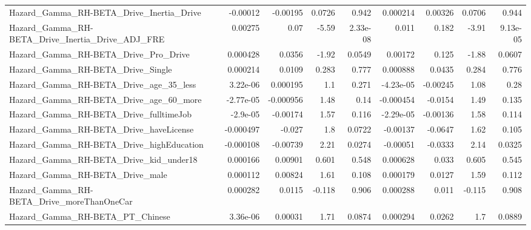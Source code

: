 \begin{tabular}{lrrrrrrrr}
Hazard\_Gamma\_RH-BETA\_Drive\_Inertia\_Drive           &    -0.00012 &     -0.00195 &   0.0726 &    0.942 &   0.000214 &     0.00326 &       0.0706 &         0.944 \\
Hazard\_Gamma\_RH-BETA\_Drive\_Inertia\_Drive\_ADJ\_FRE   &     0.00275 &         0.07 &    -5.59 & 2.33e-08 &      0.011 &       0.182 &        -3.91 &      9.13e-05 \\
Hazard\_Gamma\_RH-BETA\_Drive\_Pro\_Drive               &    0.000428 &       0.0356 &    -1.92 &   0.0549 &    0.00172 &       0.125 &        -1.88 &        0.0607 \\
Hazard\_Gamma\_RH-BETA\_Drive\_Single                  &    0.000214 &       0.0109 &    0.283 &    0.777 &   0.000888 &      0.0435 &        0.284 &         0.776 \\
Hazard\_Gamma\_RH-BETA\_Drive\_age\_35\_less             &    3.22e-06 &     0.000195 &      1.1 &    0.271 &  -4.23e-05 &    -0.00245 &         1.08 &          0.28 \\
Hazard\_Gamma\_RH-BETA\_Drive\_age\_60\_more             &   -2.77e-05 &    -0.000956 &     1.48 &     0.14 &  -0.000454 &     -0.0154 &         1.49 &         0.135 \\
Hazard\_Gamma\_RH-BETA\_Drive\_fulltimeJob             &    -2.9e-05 &     -0.00174 &     1.57 &    0.116 &  -2.29e-05 &    -0.00136 &         1.58 &         0.114 \\
Hazard\_Gamma\_RH-BETA\_Drive\_haveLicense             &   -0.000497 &       -0.027 &      1.8 &   0.0722 &   -0.00137 &     -0.0647 &         1.62 &         0.105 \\
Hazard\_Gamma\_RH-BETA\_Drive\_highEducation           &   -0.000108 &     -0.00739 &     2.21 &   0.0274 &   -0.00051 &     -0.0333 &         2.14 &        0.0325 \\
Hazard\_Gamma\_RH-BETA\_Drive\_kid\_under18             &    0.000166 &      0.00901 &    0.601 &    0.548 &   0.000628 &       0.033 &        0.605 &         0.545 \\
Hazard\_Gamma\_RH-BETA\_Drive\_male                    &    0.000112 &      0.00824 &     1.61 &    0.108 &   0.000179 &      0.0127 &         1.59 &         0.112 \\
Hazard\_Gamma\_RH-BETA\_Drive\_moreThanOneCar          &    0.000282 &       0.0115 &   -0.118 &    0.906 &   0.000288 &       0.011 &       -0.115 &         0.908 \\
Hazard\_Gamma\_RH-BETA\_PT\_Chinese                    &    3.36e-06 &      0.00031 &     1.71 &   0.0874 &   0.000294 &      0.0262 &          1.7 &        0.0889 \\

\end{tabular}
